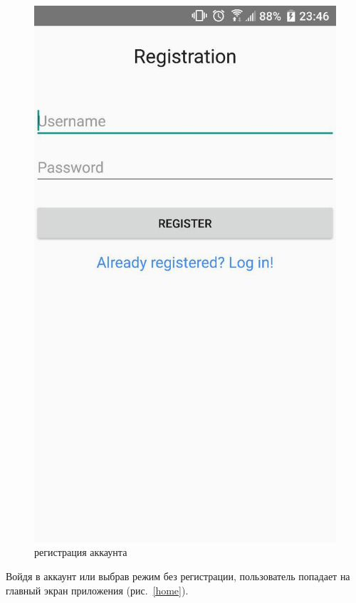 \begin{figure}[h!]
    \includegraphics[height=0.37\textheight]{./screenshots/3/register.jpg}
    \caption{\small{регистрация аккаунта}}
    \label{register}
    \endminipage{}
\end{figure}

Войдя в аккаунт или выбрав режим без регистрации, пользователь попадает на
главный экран приложения (рис.~\ref{home}).


